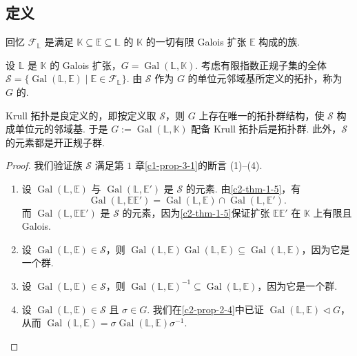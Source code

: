 \subsection{定义}

回忆 $\mathcal{F}_{\mathbb{L}}$ 是满足 $\mathbb{K}\subseteq\mathbb{E}\subseteq\mathbb{L}$ 的 $\mathbb{K}$ 的一切有限 Galois 扩张 $\mathbb{E}$ 构成的族.

\begin{definition}\label{c2-def-2-3}
设 $\mathbb{L}$ 是 $\mathbb{K}$ 的 Galois 扩张，$G=\operatorname{Gal}(\mathbb{L},\mathbb{K})$. 考虑有限指数正规子集的全体 $\mathcal{S}=\{\operatorname{Gal}(\mathbb{L},\mathbb{E})\mid\mathbb{E}\in\mathcal{F}_{\mathbb{L}}\}$. 由 $\mathcal{S}$ 作为 $G$ 的单位元邻域基所定义的拓扑，称为 $G$ 的.
\end{definition}

\begin{proposition}\label{c2-prop-2-5}
Krull 拓扑是良定义的，即按定义取 $\mathcal{S}$，则 $G$ 上存在唯一的拓扑群结构，使 $\mathcal{S}$ 构成单位元的邻域基. 于是 $G:=\operatorname{Gal}(\mathbb{L},\mathbb{K})$ 配备 Krull 拓扑后是拓扑群. 此外，$\mathcal{S}$ 的元素都是开正规子群.
\end{proposition}

\begin{proof}
我们验证族 $\mathcal{S}$ 满足第 $1$ 章\autoref{c1-prop-3-1}的断言 (1)--(4).
\begin{enumerate}
    \item 设 $\operatorname{Gal}(\mathbb{L},\mathbb{E})$ 与 $\operatorname{Gal}(\mathbb{L},\mathbb{E}')$ 是 $\mathcal{S}$ 的元素. 由\autoref{c2-thm-1-5}，有
    \[
    \operatorname{Gal}(\mathbb{L},\mathbb{E}\mathbb{E}')=\operatorname{Gal}(\mathbb{L},\mathbb{E})\cap\operatorname{Gal}(\mathbb{L},\mathbb{E}').
    \]
    而 $\operatorname{Gal}(\mathbb{L},\mathbb{E}\mathbb{E}')$ 是 $\mathcal{S}$ 的元素，因为\autoref{c2-thm-1-5}保证扩张 $\mathbb{E}\mathbb{E}'$ 在 $\mathbb{K}$ 上有限且 Galois.
    \item 设 $\operatorname{Gal}(\mathbb{L},\mathbb{E})\in\mathcal{S}$，则 $\operatorname{Gal}(\mathbb{L},\mathbb{E})\operatorname{Gal}(\mathbb{L},\mathbb{E})\subseteq\operatorname{Gal}(\mathbb{L},\mathbb{E})$，因为它是一个群.
    \item 设 $\operatorname{Gal}(\mathbb{L},\mathbb{E})\in\mathcal{S}$，则 $\operatorname{Gal}(\mathbb{L},\mathbb{E})^{-1}\subseteq\operatorname{Gal}(\mathbb{L},\mathbb{E})$，因为它是一个群.
    \item 设 $\operatorname{Gal}(\mathbb{L},\mathbb{E})\in\mathcal{S}$ 且 $\sigma\in G$. 我们在\autoref{c2-prop-2-4}中已证 $\operatorname{Gal}(\mathbb{L},\mathbb{E})\triangleleft G$，从而 $\operatorname{Gal}(\mathbb{L},\mathbb{E})=\sigma\operatorname{Gal}(\mathbb{L},\mathbb{E})\sigma^{-1}$.
\end{enumerate}
\end{proof}

